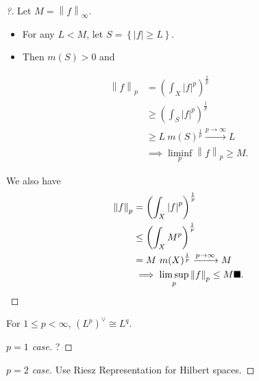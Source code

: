 \begin{proof}[?]

Let \(M = {\left\lVert {f} \right\rVert}_\infty\).

\begin{itemize}
\tightlist
\item
  For any \(L < M\), let
  \(S = \left\{{{\left\lvert {f} \right\rvert} \geq L}\right\}\).
\item
  Then \(m(S) > 0\) and
\end{itemize}

\begin{align*}
{\left\lVert {f} \right\rVert}_{p} 
&= \left( \int_X {\left\lvert {f} \right\rvert}^p \right)^{\frac 1 p} \\
&\geq \left( \int_S {\left\lvert {f} \right\rvert}^p \right)^{\frac 1 p} \\
&\geq L ~m(S)^{\frac 1 p} \overset{p\to\infty}\to L \\
&\implies \liminf_p {\left\lVert {f} \right\rVert}_{p} \geq M
.\end{align*}

We also have
\begin{align*}
{\left\lVert {f} \right\rVert}_{p} 
&=  \left( \int_X {\left\lvert {f} \right\rvert}^p \right)^{\frac 1 p} \\
&\leq \left( \int_X M^p \right)^{\frac 1 p} \\
&= M ~m(X)^{\frac 1 p} \xrightarrow{p\to\infty} M \\
&\implies \limsup_p {\left\lVert {f} \right\rVert}_{p} \leq M \hfill\blacksquare
.\end{align*}

\end{proof}

\begin{theorem}

For \(1\leq p< \infty\), \((L^p)^\vee\cong L^q\).

\end{theorem}

\begin{proof}[$p=1$ case]

?

\end{proof}


\begin{proof}[$p=2$ case]

Use Riesz Representation for Hilbert spaces.

\end{proof}

